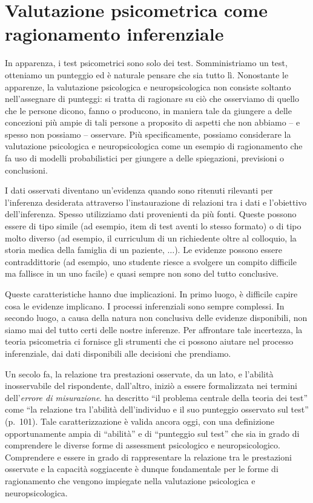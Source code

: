 \documentclass[
  11pt,
]{krantz}
\theoremstyle{definition}
\theoremstyle{definition}
\theoremstyle{definition}
\theoremstyle{definition}
\theoremstyle{remark}
\begin{document}
\hypertarget{valutazione-psicometrica-come-ragionamento-inferenziale}{%
\section{Valutazione psicometrica come ragionamento inferenziale}\label{valutazione-psicometrica-come-ragionamento-inferenziale}}

In apparenza, i test psicometrici sono solo dei test. Somministriamo un test, otteniamo un punteggio ed è naturale pensare che sia tutto lì. Nonostante le apparenze, la valutazione psicologica e neuropsicologica non consiste soltanto nell'assegnare di punteggi: si tratta di ragionare su ciò che osserviamo di quello che le persone dicono, fanno o producono, in maniera tale da giungere a delle concezioni più ampie di tali persone a proposito di aspetti che non abbiamo -- e spesso non possiamo -- osservare. Più specificamente, possiamo considerare la valutazione psicologica e neuropsicologica come un esempio di ragionamento che fa uso di modelli probabilistici per giungere a delle spiegazioni, previsioni o conclusioni.

I dati osservati diventano un'evidenza quando sono ritenuti rilevanti per l'inferenza desiderata attraverso l'instaurazione di relazioni tra i dati e l'obiettivo dell'inferenza. Spesso utilizziamo dati provenienti da più fonti. Queste possono essere di tipo simile (ad esempio, item di test aventi lo stesso formato) o di tipo molto diverso (ad esempio, il curriculum di un richiedente oltre al colloquio, la storia medica della famiglia di un paziente, \(\dots\)). Le evidenze possono essere contraddittorie (ad esempio, uno studente riesce a svolgere un compito difficile ma fallisce in un uno facile) e quasi sempre non sono del tutto conclusive.

Queste caratteristiche hanno due implicazioni. In primo luogo, è difficile capire cosa le evidenze implicano. I processi inferenziali sono sempre complessi. In secondo luogo, a causa della natura non conclusiva delle evidenze disponibili, non siamo mai del tutto certi delle nostre inferenze. Per affrontare tale incertezza, la teoria psicometria ci fornisce gli strumenti che ci possono aiutare nel processo inferenziale, dai dati disponibili alle decisioni che prendiamo.

Un secolo fa, la relazione tra prestazioni osservate, da un lato, e l'abilità inosservabile del rispondente, dall'altro, iniziò a essere formalizzata nei termini dell'\emph{errore di misurazione}. \citet{gulliksen1961measurement} ha descritto ``il problema centrale della teoria dei test'' come ``la relazione tra l'abilità dell'individuo e il suo punteggio osservato sul test'' (p.~101). Tale caratterizzazione è valida ancora oggi, con una definizione opportunamente ampia di ``abilità'' e di ``punteggio sul test'' che sia in grado di comprendere le diverse forme di assessment psicologico e neuropsicologico. Comprendere e essere in grado di rappresentare la relazione tra le prestazioni osservate e la capacità soggiacente è dunque fondamentale per le forme di ragionamento che vengono impiegate nella valutazione psicologica e neuropsicologica.
\end{document}
